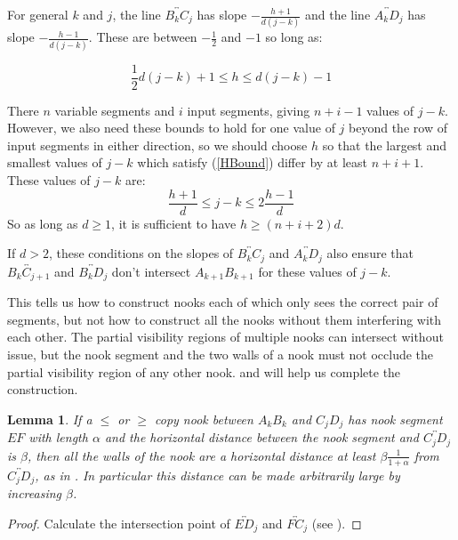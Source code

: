 \documentclass[11pt]{article}
\theoremstyle{plain}
\newtheorem{lemma}[theorem]{Lemma}
\theoremstyle{definition}
\numberwithin{theorem}{section}
\begin{document}
For general $k$ and $j$, the line $\overleftrightarrow{B_kC_j}$ has slope $-\frac{h+1}{d(j-k)}$ and the line $\overleftrightarrow{A_kD_j}$ has slope $-\frac{h-1}{d(j-k)}$. These are between $-\frac12$ and $-1$ so long as:

\begin{equation}
\label{HBound}
\frac12d(j-k)+1\le h\le d(j-k)-1
\end{equation}

There $n$ variable segments and $i$ input segments, giving $n+i-1$ values of $j-k$. However, we also need these bounds to hold for one value of $j$ beyond the row of input segments in either direction, so we should choose $h$ so that the largest and smallest values of $j-k$ which satisfy (\ref{HBound}) differ by at least $n+i+1$. These values of $j-k$ are:
\begin{equation}
\label{JKRange}
\frac{h+1}{d}\le j-k\le 2\frac{h-1}{d}
\end{equation}
So as long as $d\ge 1$, it is sufficient to have $h\ge (n+i+2)d$. 

If $d>2$, these conditions on the slopes of $\overleftrightarrow{B_kC_j}$ and $\overleftrightarrow{A_kD_j}$ also ensure that $\overleftrightarrow{B_kC_{j+1}}$ and $\overleftrightarrow{B_kD_j}$ don't intersect $A_{k+1}B_{k+1}$ for these values of $j-k$.

This tells us how to construct nooks each of which only sees the correct pair of segments, but not how to construct all the nooks without them interfering with each other. The partial visibility regions of multiple nooks can intersect without issue, but the nook segment and the two walls of a nook must not occlude the partial visibility region of any other nook.  and  will help us complete the construction.

\begin{lemma}\label{lem:NookWall}
If a $\le$ or $\ge$ copy nook between $A_kB_k$ and $C_jD_j$ has nook segment $EF$ with length $\alpha$ and the horizontal distance between the nook segment and $\overleftrightarrow{C_jD_j}$ is $\beta$, then all the walls of the nook are a horizontal distance at least $\beta\frac{1}{1+\alpha}$ from $\overleftrightarrow{C_jD_j}$, as in . In particular this distance can be made arbitrarily large by increasing $\beta$.
\end{lemma}

\begin{proof}
Calculate the intersection point of $\overleftrightarrow{ED_j}$ and $\overleftrightarrow{FC_j}$ (see ).
\end{proof}
\end{document}
